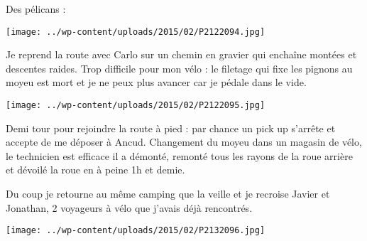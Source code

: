  Des pélicans :
\begin{center} \texttt{[image: ../wp-content/uploads/2015/02/P2122094.jpg]} \end{center}

 Je reprend la route avec Carlo sur un chemin en gravier qui enchaîne montées et descentes raides. 
 Trop difficile pour mon vélo : le filetage qui fixe les pignons au moyeu est mort et je ne peux plus avancer car je pédale dans le vide.
\begin{center} \texttt{[image: ../wp-content/uploads/2015/02/P2122095.jpg]} \end{center}

 Demi tour pour rejoindre la route à pied : par chance un pick up s'arrête et accepte de me déposer à Ancud.
 Changement du moyeu dans un magasin de vélo, le technicien est efficace il a démonté, remonté tous les rayons de la roue arrière et dévoilé la roue en à peine 1h et demie.

 Du coup je retourne au même camping que la veille et je recroise Javier et Jonathan, 2 voyageurs à vélo que j'avais déjà rencontrés.
\begin{center} \texttt{[image: ../wp-content/uploads/2015/02/P2132096.jpg]} \end{center}